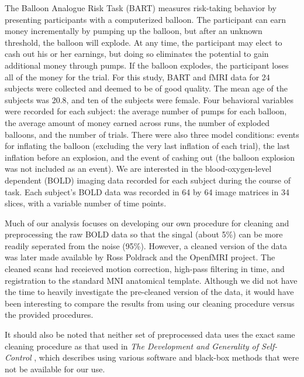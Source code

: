 \par \indent The Balloon Analogue Risk Task (BART) measures risk-taking 
behavior by presenting participants with a computerized balloon. The 
participant can earn money incrementally by pumping up the balloon, but after 
an unknown threshold, the balloon will explode. At any time, the participant 
may elect to cash out his or her earnings, but doing so eliminates the 
potential to gain additional money through pumps. If the balloon explodes, the 
participant loses all of the money for the trial. For this study, BART and 
fMRI data for 24 subjects were collected and deemed to be of good quality. 
The mean age of the subjects was 20.8, and ten of the subjects were female. 
Four behavioral variables were recorded for each subject: the average number 
of pumps for each balloon, the average amount of money earned across runs, the 
number of exploded balloons, and the number of trials. There were also three 
model conditions: events for inflating the balloon (excluding the very last 
inflation of each trial), the last inflation before an explosion, and the 
event of cashing out (the balloon explosion was not included as an event). We 
are interested in the blood-oxygen-level dependent (BOLD) imaging data 
recorded for each subject during the course of task. Each subject's BOLD data 
was recorded in 64 by 64 image matrices in 34 slices, with a variable number 
of time points. 

\par Much of our analysis focuses on developing our own procedure for cleaning 
and preprocessing the raw BOLD data so that the singal (about 5\%) can be more 
readily seperated from the noise (95\%). However, a cleaned version of the 
data was later made available by Ross Poldrack and the OpenfMRI project. The 
cleaned scans had receieved motion correction, high-pass filtering in time, 
and registration to the standard MNI anatomical template. Although we did not 
have the time to heavily investigate the pre-cleaned version of the data, it 
would have been interesting to compare the results from using our cleaning 
procedure versus the provided procedures.

\par It should also be noted that neither set of preprocessed data uses the 
exact same cleaning procedure as that used in \textit{The Development and 
Generality of Self-Control} \cite{CohenSelfControl}, which describes using 
various software and black-box methods that were not be available for our use. 
